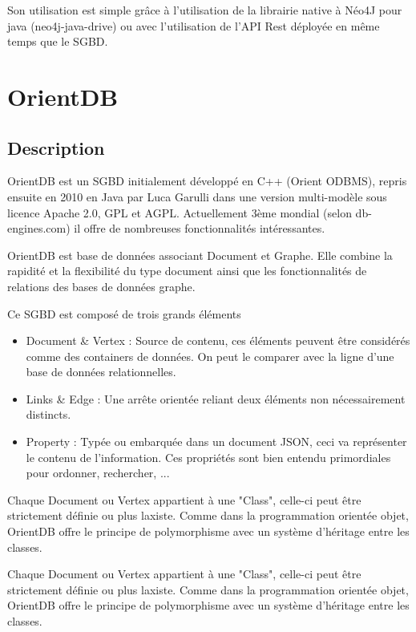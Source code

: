 \documentclass[a4paper,fleqn,12pt]{report}
\begin{document}
Son utilisation est simple grâce à l’utilisation de la librairie native à Néo4J pour java (neo4j-java-drive) ou avec l’utilisation de l’API Rest déployée en même temps que le SGBD.

\section{OrientDB}

\subsection{Description}

OrientDB est un SGBD initialement développé en C++ (Orient ODBMS), repris ensuite en 2010 en Java par Luca Garulli dans une version multi-modèle sous licence Apache 2.0, GPL et AGPL. Actuellement 3ème mondial (selon db-engines.com) il offre de nombreuses fonctionnalités intéressantes.\cite{OrientDBSite}

OrientDB est base de données associant Document et Graphe. Elle combine la rapidité et la flexibilité du type document ainsi que les fonctionnalités de relations des bases de données graphe.

Ce SGBD est composé de trois grands éléments 

\begin{itemize}
\item Document \& Vertex : Source de contenu, ces éléments peuvent être considérés comme des containers de données. On peut le comparer avec la ligne d'une base de données relationnelles.
\item Links \& Edge : Une arrête orientée reliant deux éléments non nécessairement distincts.
\item Property : Typée ou embarquée dans un document JSON, ceci va représenter le contenu de l'information. Ces propriétés sont bien entendu primordiales pour ordonner, rechercher, ...
\end{itemize}

Chaque Document ou Vertex appartient à une "Class", celle-ci peut être strictement définie ou plus laxiste. Comme dans la programmation orientée objet, OrientDB offre le principe de polymorphisme avec un système d'héritage entre les classes. 

Chaque Document ou Vertex appartient à une "Class", celle-ci peut être strictement définie ou plus laxiste. Comme dans la programmation orientée objet, OrientDB offre le principe de polymorphisme avec un système d’héritage entre les classes.
\end{document}
